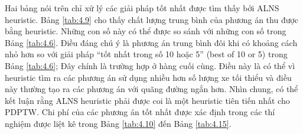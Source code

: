 Hai bảng nói trên chỉ xử lý các giải pháp tốt nhất được tìm thấy bởi ALNS heuristic. Bảng \ref{tab:4.9} cho thấy chất lượng trung bình của phương án thu được bằng heuristic. Những con số này có thể được so sánh với những con số trong Bảng \ref{tab:4.6}. Điều đáng chú ý là phương án trung bình đôi khi có khoảng cách nhỏ hơn so với giải pháp “tốt nhất trong số 10 hoặc 5” (best of 10 or 5) trong Bảng \ref{tab:4.6}; Đây chính là trường hợp ở hàng cuối cùng. Điều này là có thể vì heuristic tìm ra các phương án sử dụng nhiều hơn số lượng xe tối thiểu và điều này thường tạo ra các phương án với quãng đường ngắn hơn.
Nhìn chung, có thể kết luận rằng ALNS heuristic phải được coi là một heuristic tiên tiến nhất cho PDPTW. Chi phí của các phương án tốt nhất được xác định trong các thí nghiệm được liệt kê trong Bảng \ref{tab:4.10} đến Bảng \ref{tab:4.15}.


